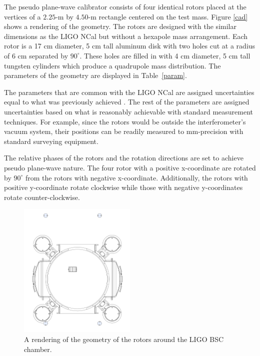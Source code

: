 \documentclass[superscriptaddress, twocolumn, prd]{revtex4-1}
\begin{document}
The pseudo plane-wave calibrator consists of four identical rotors placed at the vertices of a $2.25$-m by $4.50$-m rectangle centered on the test mass. Figure \ref{cad} shows a rendering of the geometry. The rotors are designed with the similar dimensions as the LIGO NCal \cite{ncal} but without a hexapole mass arrangement. Each rotor is a 17 cm diameter, 5 cm tall aluminum disk with two holes cut at a radius of 6 cm separated by $90^\circ$. These holes are filled in with 4 cm diameter, 5 cm tall  tungsten cylinders which produce a quadrupole mass distribution. The parameters of the geometry are displayed in Table~\ref{param}.

The parameters that are common with the LIGO NCal are assigned uncertainties equal to what was previously achieved \cite{ncal}. The rest of the parameters are assigned uncertainties based on what is reasonably achievable with standard measurement techniques. For example, since the rotors would be outside the interferometer's vacuum system, their positions can be readily measured to  mm-precision with standard surveying equipment.

The relative phases of the rotors and the rotation directions are set to achieve pseudo plane-wave nature. The four rotor with a positive x-coordinate are rotated by $90^\circ$ from the rotors with negative x-coordinate. Additionally, the rotors with positive y-coordinate rotate clockwise while those with negative y-coordinates rotate counter-clockwise. 

\begin{figure}[!h]
\centering \includegraphics[width=0.5\textwidth]{Super4BSCTopDown.pdf}
\caption{A rendering of the geometry of the rotors around the LIGO BSC chamber.}
\label{bsc} 
\end{figure}
\end{document}
